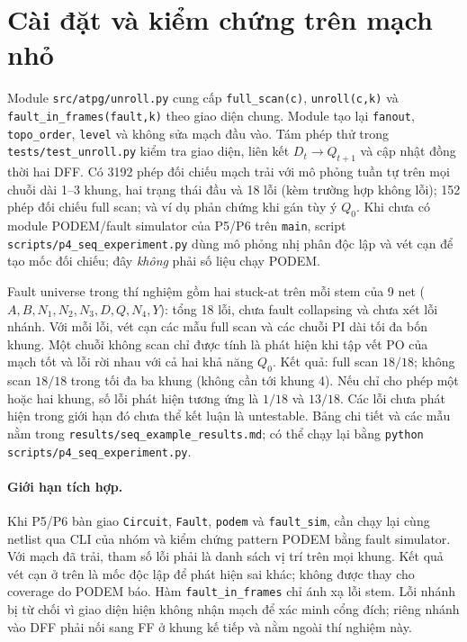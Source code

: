 \section{Cài đặt và kiểm chứng trên mạch nhỏ}
\label{sec:p4-thuc-nghiem}
Module \texttt{src/atpg/unroll.py} cung cấp
\texttt{full\_scan(c)}, \texttt{unroll(c,k)} và
\texttt{fault\_in\_frames(fault,k)} theo giao diện chung. Module tạo lại
\texttt{fanout}, \texttt{topo\_order}, \texttt{level} và không sửa mạch
đầu vào. Tám phép thử trong \texttt{tests/test\_unroll.py} kiểm tra
giao diện, liên kết $D_t\rightarrow Q_{t+1}$ và cập nhật đồng thời hai DFF.
Có 3192 phép đối chiếu mạch trải với mô phỏng tuần tự trên mọi chuỗi dài
1--3 khung, hai trạng thái đầu và 18 lỗi (kèm trường hợp không lỗi);
152 phép đối chiếu full scan; và ví dụ phản chứng khi gán tùy ý $Q_0$.
Khi chưa có module PODEM/fault simulator của P5/P6 trên
\texttt{main}, script \texttt{scripts/p4\_seq\_experiment.py} dùng mô
phỏng nhị phân độc lập và vét cạn để tạo mốc đối chiếu; đây \emph{không}
phải số liệu chạy PODEM.

Fault universe trong thí nghiệm gồm hai stuck-at trên mỗi stem của 9 net
($A,B,N_1,N_2,N_3,D,Q,N_4,Y$): tổng 18 lỗi, chưa fault collapsing và
chưa xét lỗi nhánh. Với mỗi lỗi, vét cạn các mẫu full scan và các chuỗi
PI dài tối đa bốn khung. Một chuỗi không scan chỉ được tính là phát hiện
khi tập vết PO của mạch tốt và lỗi rời nhau với cả hai khả năng $Q_0$.
Kết quả: full scan $18/18$; không scan $18/18$ trong tối đa ba khung
(không cần tới khung 4). Nếu chỉ cho phép một hoặc hai khung, số lỗi phát
hiện tương ứng là $1/18$ và $13/18$. Các lỗi chưa phát hiện trong giới hạn
đó chưa thể kết luận là untestable. Bảng chi tiết và các mẫu nằm trong
\texttt{results/seq\_example\_results.md}; có thể chạy lại bằng
\texttt{python scripts/p4\_seq\_experiment.py}.

\paragraph{Giới hạn tích hợp.}
Khi P5/P6 bàn giao \texttt{Circuit}, \texttt{Fault}, \texttt{podem} và
\texttt{fault\_sim}, cần chạy lại cùng netlist qua CLI của nhóm và kiểm
chứng pattern PODEM bằng fault simulator. Với mạch đã trải, tham số lỗi
phải là danh sách vị trí trên mọi khung. Kết quả vét cạn ở trên là mốc
độc lập để phát hiện sai khác; không được thay cho coverage do PODEM báo.
Hàm \texttt{fault\_in\_frames} chỉ ánh xạ lỗi stem. Lỗi nhánh bị từ chối
vì giao diện hiện không nhận mạch để xác minh cổng đích; riêng nhánh vào
DFF phải nối sang FF ở khung kế tiếp và nằm ngoài thí nghiệm này.
